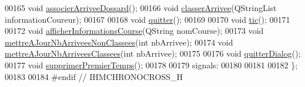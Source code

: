 \begin{DoxyCode}
00165     \textcolor{keywordtype}{void} \hyperlink{class_i_h_m_chrono_cross_a9f7f1ad130b60300a879694b6234f161}{associerArriveeDossard}();
00166     \textcolor{keywordtype}{void} \hyperlink{class_i_h_m_chrono_cross_a5e9b561659ba63d2739335b8ab432cbf}{classerArrivee}(QStringList informationCoureur);
00167 
00168     \textcolor{keywordtype}{void} \hyperlink{class_i_h_m_chrono_cross_a283c721d31f90031d9a189eafb303b84}{quitter}();
00169 
00170     \textcolor{keywordtype}{void} \hyperlink{class_i_h_m_chrono_cross_a9706094a679e33f3595e28776596a91b}{tic}();
00171 
00172     \textcolor{keywordtype}{void} \hyperlink{class_i_h_m_chrono_cross_afe18e84e4df15c15921f2bdcfc6f4396}{afficherInformationsCourse}(QString nomCourse);
00173     \textcolor{keywordtype}{void} \hyperlink{class_i_h_m_chrono_cross_a1b23fda62742f2dd17652d3abcb33dd6}{mettreAJourNbArriveesNonClassees}(\textcolor{keywordtype}{int} nbArrivee);
00174     \textcolor{keywordtype}{void} \hyperlink{class_i_h_m_chrono_cross_a3d786cb4b5c5e3a4bd566f19409601d5}{mettreAJourNbArriveesClassees}(\textcolor{keywordtype}{int} nbArrivee);
00175 
00176     \textcolor{keywordtype}{void} \hyperlink{class_i_h_m_chrono_cross_a1e8e6d42ec7397a619940bc7bec4a6ca}{quitterDialog}();
00177     \textcolor{keywordtype}{void} \hyperlink{class_i_h_m_chrono_cross_aca8b5d6683a3ab0018066ec16968f3f3}{supprimerPremierTemps}();
00178 
00179 signals:
00180 
00181 
00182 \};
00183 
00184 \textcolor{preprocessor}{#endif // IHMCHRONOCROSS\_H}
\end{DoxyCode}
